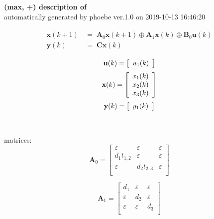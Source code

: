 \documentclass[11pt, a4paper, fleqn]{article}
\begin{document}
\noindent
\textbf{(max, +) description of} \texttt{\currfilebase} \\
automatically generated by phoebe ver.1.0 on 2019-10-13 16:46:20 

\begin{align}\begin{split}
\mathbf{x}(k+1) & \, = \; \mathbf{A}_{0}\mathbf{x}(k+1) \oplus \mathbf{A}_{1}\mathbf{x}(k) \oplus \mathbf{B}_{0}\mathbf{u}(k)\\
\mathbf{y}(k) & \, = \; \mathbf{Cx}(k)
\end{split}\end{align}

\begin{equation*}
\mathbf{u}(k) = 
\left[\begin{array}{*{20}c}
  u_1(k) \\
\end{array}\right]
\end{equation*}
\begin{equation*}
\mathbf{x}(k) = 
\left[\begin{array}{*{20}c}
  x_1(k) \\
  x_2(k) \\
  x_3(k) \\
\end{array}\right]
\end{equation*}
\begin{equation*}
\mathbf{y}(k) = 
\left[\begin{array}{*{20}c}
  y_1(k) \\
\end{array}\right]
\end{equation*}
\\
\\
matrices:
\begin{equation*}
\mathbf{A}_{0} = 
\left[\begin{array}{ ccc }
\varepsilon	&\varepsilon	&\varepsilon\\
d_1t_{1,2}	&\varepsilon	&\varepsilon\\
\varepsilon	&d_2t_{2,3}	&\varepsilon\\
\end{array}\right]
\end{equation*}

\begin{equation*}
\mathbf{A}_{1} = 
\left[\begin{array}{ ccc }
d_1	&\varepsilon	&\varepsilon\\
\varepsilon	&d_2	&\varepsilon\\
\varepsilon	&\varepsilon	&d_3\\
\end{array}\right]
\end{equation*}
\end{document}
